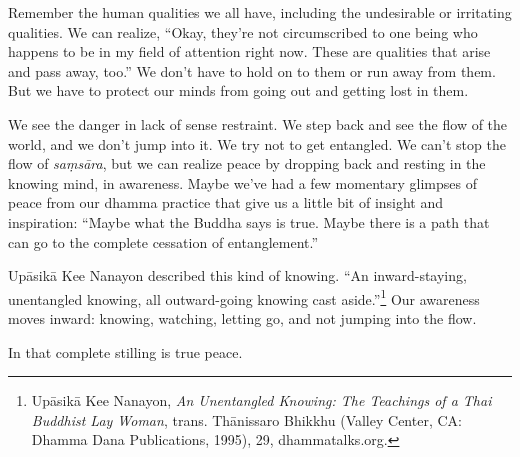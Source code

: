 Remember the human qualities we all have, including the undesirable or irritating qualities. We can realize, ``Okay, they're not circumscribed to one being who happens to be in my field of attention right now. These are qualities that arise and pass away, too.'' We don't have to hold on to them or run away from them. But we have to protect our minds from going out and getting lost in them.

We see the danger in lack of sense restraint. We step back and see the flow of the world, and we don't jump into it. We try not to get entangled. We can't stop the flow of \emph{saṃsāra}, but we can realize peace by dropping back and resting in the knowing mind, in awareness. Maybe we've had a few momentary glimpses of peace from our dhamma practice that give us a little bit of insight and inspiration: ``Maybe what the Buddha says is true. Maybe there is a path that can go to the complete cessation of entanglement.''

\enlargethispage{1.5\baselineskip}
Upāsikā Kee Nanayon described this kind of knowing. ``An inward-staying, unentangled knowing, all outward-going knowing cast aside.''\footnote{Upāsikā Kee Nanayon, \emph{An Unentangled Knowing: The Teachings of a Thai Buddhist Lay Woman}, trans. Thānissaro Bhikkhu (Valley Center, CA: Dhamma Dana Publications, 1995), 29, dhammatalks.org.} Our awareness moves inward: knowing, watching, letting go, and not jumping into the flow.

In that complete stilling is true peace.
